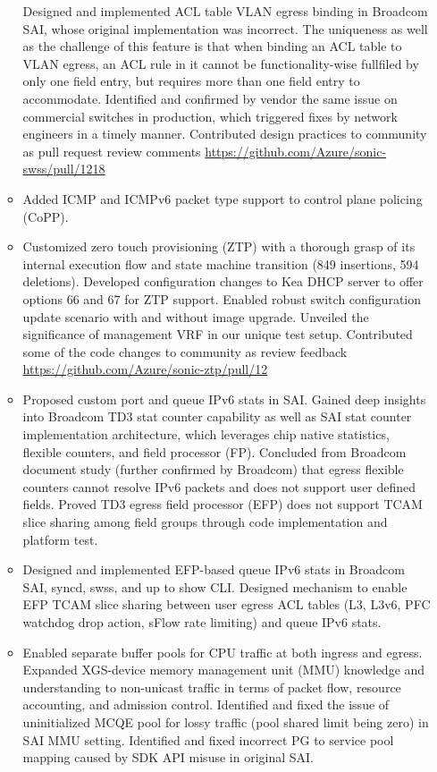 \documentclass[letterpaper,11pt]{article}
\newcommand{\resitem}[1]{\item #1 \vspace{-2pt}}
\begin{document}
\begin{CJK}{UTF8}{gbsn}
\begin{itemize}
\begin{itemize}
{  Designed and implemented ACL table VLAN egress binding in Broadcom SAI, whose original implementation was incorrect.
  The uniqueness as well as the challenge of this feature is that when binding an ACL table to VLAN egress, an ACL rule in it
  cannot be functionality-wise fullfiled by only one field entry, but requires more than one field entry to accommodate.
  Identified and confirmed by vendor the same issue on commercial switches in production, which triggered fixes by network engineers
  in a timely manner.
  Contributed design practices to community as pull request review comments \url{https://github.com/Azure/sonic-swss/pull/1218}}
  \resitem{Added ICMP and ICMPv6 packet type support to control plane policing (CoPP).}
  \resitem{Customized zero touch provisioning (ZTP) with a thorough grasp of its internal execution flow and state machine
  transition (849 insertions, 594 deletions).
  Developed configuration changes to Kea DHCP server to offer options 66 and 67 for ZTP support.
  Enabled robust switch configuration update scenario with and without image upgrade.
  Unveiled the significance of management VRF in our unique test setup.
  Contributed some of the code changes to community as review feedback \url{https://github.com/Azure/sonic-ztp/pull/12}}
  \resitem{Proposed custom port and queue IPv6 stats in SAI. Gained deep insights into Broadcom TD3 stat counter capability
  as well as SAI stat counter implementation architecture, which leverages chip native statistics, flexible counters, and field processor (FP).
  Concluded from Broadcom document study (further confirmed by Broadcom) that egress flexible counters cannot resolve IPv6 packets
  and does not support user defined fields.
  Proved TD3 egress field processor (EFP) does not support TCAM slice sharing among field groups through code implementation and platform test.}
  \resitem{Designed and implemented EFP-based queue IPv6 stats in Broadcom SAI, syncd, swss, and up to show CLI.
  Designed mechanism to enable EFP TCAM slice sharing between user egress ACL tables (L3, L3v6, PFC watchdog drop action, sFlow rate limiting)
  and queue IPv6 stats.}
  \resitem{Enabled separate buffer pools for CPU traffic at both ingress and egress. Expanded XGS-device memory management unit (MMU)
  knowledge and understanding to
  non-unicast traffic in terms of packet flow, resource accounting, and admission control.
  Identified and fixed the issue of uninitialized MCQE pool for lossy traffic (pool shared limit being zero) in SAI MMU setting.
  Identified and fixed incorrect PG to service pool mapping caused by SDK API misuse in original SAI.}

\end{itemize}
\end{itemize}
\end{CJK}
\end{document}
